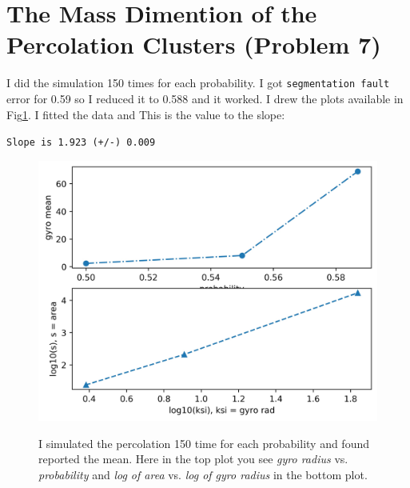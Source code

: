 \documentclass[12pt]{article}
\begin{document}
	\section{The Mass Dimention of the Percolation Clusters (Problem 7)}
	I did the simulation 150 times for each probability. I got \texttt{segmentation fault} error for 0.59 so I reduced it to 0.588 and it worked.
	I drew the plots available in Fig\ref{fig:area-gyro}.
	I fitted the data and This is the value to the slope:\\
	\centerline{\texttt{Slope is 1.923 (+/-) 0.009}}
	\begin{figure}[h!]
		\centering
		\includegraphics[width=0.9\linewidth]{../p7/area-gyro.jpg}
		\label{fig:area-gyro}
		\caption{I simulated the percolation 150 time for each probability and found reported the mean. Here
		in the top plot you see \emph{gyro radius} vs. \emph{probability}
		and \emph{log of area} vs. \emph{log of gyro radius} in the bottom plot.}
	\end{figure}
\end{document}
